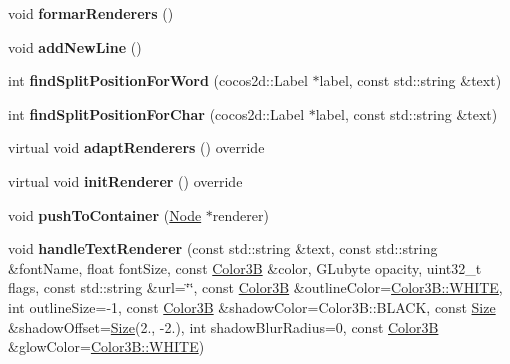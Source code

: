 \begin{DoxyCompactItemize}
\item 
\mbox{\label{classui_1_1RichText_a8ff3eb18627c1838187a445600cc7573}} 
void {\bfseries formar\+Renderers} ()
\item 
\mbox{\label{classui_1_1RichText_a1b8cca846778f4c86c094e9b2a1ce1e9}} 
void {\bfseries add\+New\+Line} ()
\item 
\mbox{\label{classui_1_1RichText_ac61c3506f05a1e1403285e3114974f70}} 
int {\bfseries find\+Split\+Position\+For\+Word} (cocos2d\+::\+Label $\ast$label, const std\+::string \&text)
\item 
\mbox{\label{classui_1_1RichText_a712b57c98845f615f924a07285e77668}} 
int {\bfseries find\+Split\+Position\+For\+Char} (cocos2d\+::\+Label $\ast$label, const std\+::string \&text)
\item 
\mbox{\label{classui_1_1RichText_a588bd6db644fdfc6205948503f007c9c}} 
virtual void {\bfseries adapt\+Renderers} () override
\item 
\mbox{\label{classui_1_1RichText_ab39e5ede39b969ec3c5c5495f60423f3}} 
virtual void {\bfseries init\+Renderer} () override
\item 
\mbox{\label{classui_1_1RichText_ad61247d0c0acb2218b034a12dc6fc6e4}} 
void {\bfseries push\+To\+Container} (\hyperlink{classNode}{Node} $\ast$renderer)
\item 
\mbox{\label{classui_1_1RichText_aaec0885af9c4f2ff188c97288c99a199}} 
void {\bfseries handle\+Text\+Renderer} (const std\+::string \&text, const std\+::string \&font\+Name, float font\+Size, const \hyperlink{structColor3B}{Color3B} \&color, G\+Lubyte opacity, uint32\+\_\+t flags, const std\+::string \&url=\char`\"{}\char`\"{}, const \hyperlink{structColor3B}{Color3B} \&outline\+Color=\hyperlink{structColor3B_adf57cb86ca15f434b29215ad471cdc35}{Color3\+B\+::\+W\+H\+I\+TE}, int outline\+Size=-\/1, const \hyperlink{structColor3B}{Color3B} \&shadow\+Color=Color3\+B\+::\+B\+L\+A\+CK, const \hyperlink{classSize}{Size} \&shadow\+Offset=\hyperlink{classSize}{Size}(2., -\/2.), int shadow\+Blur\+Radius=0, const \hyperlink{structColor3B}{Color3B} \&glow\+Color=\hyperlink{structColor3B_adf57cb86ca15f434b29215ad471cdc35}{Color3\+B\+::\+W\+H\+I\+TE})

\end{DoxyCompactItemize}
